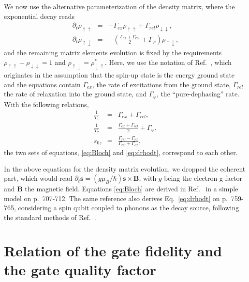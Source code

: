 \documentclass[aps, prx, showpacs, twocolumn, superscriptaddress, notitlepage, longbibliography, floatfix, nofootinbib]{revtex4-2}
\begin{document}
We now use the alternative parameterization of the density matrix, where the exponential decay reads
\begin{subequations}
\begin{eqnarray}
\partial_t \rho_{\uparrow\uparrow} &=&-\Gamma_{ex} \rho_{\uparrow\uparrow} + \Gamma_{rel} \rho_{\downarrow\downarrow} ,\\
\partial_t \rho_{\uparrow\downarrow} &=&-\left( \frac{\Gamma_{ex}+\Gamma_{rel}}{2} + \Gamma_\varphi \right) \rho_{\uparrow\downarrow},
\end{eqnarray}
\label{eq:drhodt}
\end{subequations}
and the remaining matrix elements evolution is fixed by the requirements $\rho_{\uparrow\uparrow}+\rho_{\downarrow\downarrow} =1$ and $\rho_{\uparrow\downarrow} = \rho_{\downarrow\uparrow}^*$. Here, we use the notation of Ref.~\cite{ithier_decoherence_2005}, which originates in the assumption that the spin-up state is the energy ground state and the equations contain $\Gamma_{ex}$, the rate of excitations from the ground state, $\Gamma_{rel}$ the rate of relaxation into the ground state, and $\Gamma_\varphi$, the ``pure-dephasing'' rate. With the following relations,
\begin{subequations}
\begin{eqnarray}
\frac{1}{T_1} &=&\Gamma_{ex} + \Gamma_{rel},\\
\frac{1}{T_2} &=&\frac{\Gamma_{ex} + \Gamma_{rel}}{2} + \Gamma_\varphi,\\
s_{0z} &=& \frac{\Gamma_{rel} - \Gamma_{ex}}{\Gamma_{rel} + \Gamma_{ex}},
\end{eqnarray}
\end{subequations}
the two sets of equations, \eqref{eq:Bloch} and \eqref{eq:drhodt}, correspond to each other.

In the above equations for the density matrix evolution, we dropped the coherent part, which would read $\partial_t \mathbf{s} = (g \mu_B / \hbar) \mathbf{s} \times \mathbf{B}$, with $g$ being the electron g-factor and $\mathbf{B}$ the magnetic field. Equations \eqref{eq:Bloch} are derived in Ref.~\cite{fabian_semiconductor_2007} in a simple model on p.~707-712. The same reference also derives Eq.~\eqref{eq:drhodt} on p.~759-765, considering a spin qubit coupled to phonons as the decay source, following the standard methods of Ref.~\cite{blum_density_1996}.

\section{Relation of the gate fidelity and the gate quality factor}
\end{document}
